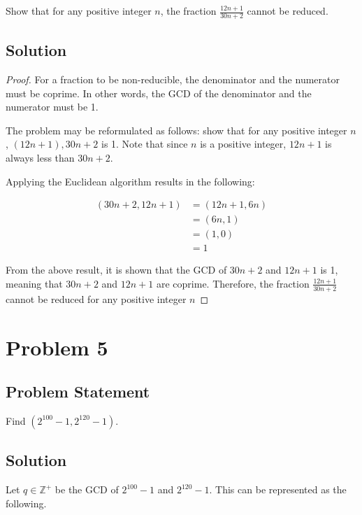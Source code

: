\documentclass{article}
\begin{document}
Show that for any positive integer $n$, the fraction $\frac{12 n + 1}{30n + 2}$ cannot be reduced.

\subsection*{Solution}

\begin{proof}
	For a fraction to be non-reducible, the denominator and the numerator must be coprime. In other words, the GCD of the denominator and the numerator must be 1.

	The problem may be reformulated as follows: show that for any positive integer $n$, $(12n + 1), 30n + 2$ is 1. Note that since $n$ is a positive integer, $12n + 1$ is always less than $30n + 2$.

	Applying the Euclidean algorithm results in the following:

	\begin{align*}
		(30n + 2, 12n + 1) & = (12n + 1, 6n) \\
		                   & = (6n, 1)       \\
		                   & = (1, 0)        \\
		                   & = 1
	\end{align*}

	From the above result, it is shown that the GCD of $30n + 2$ and $12n + 1$ is 1, meaning that $30n + 2$ and $12n + 1$ are coprime. Therefore, the fraction $\frac{12n + 1}{30n + 2}$ cannot be reduced for any positive integer $n$

\end{proof}

\section*{Problem 5}

\subsection*{Problem Statement}

Find $(2^{100} - 1, 2^{120} - 1)$.

\subsection*{Solution}

Let $q \in \mathbb{Z}^+$ be the GCD of $2^{100} - 1$ and $2^{120} - 1$. This can be represented as the following.
\end{document}
